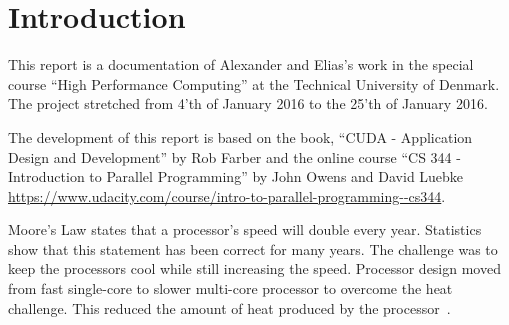 \chapter{Introduction}
\label{chap:introduction}

This report is a documentation of Alexander and Elias's work in the special course ``High Performance Computing'' at the Technical University of Denmark.
The project stretched from 4'th of January 2016 to the 25'th of January 2016.

The development of this report is based on the book, ``CUDA - Application Design and Development'' by Rob Farber \cite{farber2011cuda} and the online course ``CS 344 - Introduction to Parallel Programming'' by John Owens and David Luebke \url{https://www.udacity.com/course/intro-to-parallel-programming--cs344}.

Moore's Law states that a processor's speed will double every year.
Statistics show that this statement has been correct for many years.
The challenge was to keep the processors cool while still increasing the speed.
Processor design moved from fast single-core to slower multi-core processor to overcome the heat challenge.
This reduced the amount of heat produced by the processor~\cite{schaller1997moore,bryant2003computer}.


